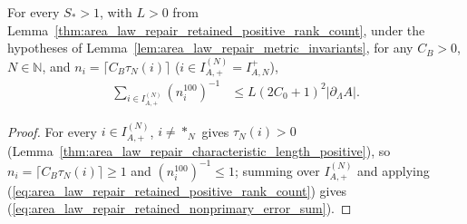 \begin{lemma}
    \label{thm:area_law_repair_retained_nonprimary_error_sum}
    \leanok
    For every $S_*>1$, with $L>0$ from Lemma~\ref{thm:area_law_repair_retained_positive_rank_count},
    under the hypotheses of Lemma~\ref{lem:area_law_repair_metric_invariants}, for any $C_B>0$,
    $N\in\mathbb N$, and $n_i=\lceil C_B\tau_N(i)\rceil$ ($i\in I_{A,+}^{(N)}=I_{A,N}^+$),
    \begin{align}
        \sum_{i\in I_{A,+}^{(N)}}(n_i^{100})^{-1}
         & \le L(2C_0+1)^2|\partial_\Lambda A|.
        \label{eq:area_law_repair_retained_nonprimary_error_sum}
    \end{align}
\end{lemma}

\begin{proof}
    \leanok
    For every $i\in I_{A,+}^{(N)}$, $i\ne *_N$ gives $\tau_N(i)>0$
    (Lemma~\ref{thm:area_law_repair_characteristic_length_positive}), so $n_i=\lceil C_B\tau_N(i)\rceil\ge1$
    and $(n_i^{100})^{-1}\le1$; summing over $I_{A,+}^{(N)}$ and applying
    (\ref{eq:area_law_repair_retained_positive_rank_count}) gives
    (\ref{eq:area_law_repair_retained_nonprimary_error_sum}).
\end{proof}
